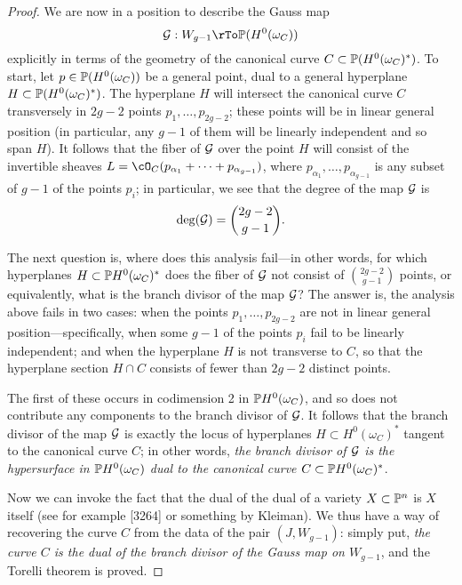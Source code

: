 \begin{proof}

We are now in a position to describe the Gauss map
$$
\cG : W_{g-1} \rTo  \PP(H^0(\omega_C))
$$
explicitly in terms of the geometry of the canonical curve $C \subset \PP(H^0(\omega_C)^*)$. To start, let $p \in \PP(H^0(\omega_C))$ be a general point, dual to a general hyperplane $H \subset \PP(H^0(\omega_C)^*)$. The hyperplane $H$ will intersect the canonical curve $C$ transversely in $2g-2$ points $p_1,\dots,p_{2g-2}$; these points will be in linear general position (in particular, any $g-1$ of them will be linearly independent and so span $H$). It follows that the fiber of $\cG$ over the point $H$ will consist of the invertible sheaves $L = \cO_C(p_{\alpha_1} + \dots + p_{\alpha_{g-1}})$, where $p_{\alpha_1}, \dots, p_{\alpha_{g-1}}$ is any subset of $g-1$ of the points $p_i$; in particular, we see that the degree of the map $\cG$ is
$$
\deg (\cG) = \binom{2g-2}{g-1}.
$$

The next question is, where does this analysis fail---in other words, for which hyperplanes $H \subset \PP H^0(\omega_C)^*$ does the fiber of $\cG$ not consist of $\binom{2g-2}{g-1}$ points, or equivalently,
what is the branch divisor of the map $\cG$? The answer is, the analysis above fails in two cases: when the points $p_1,\dots, p_{2g-2}$ are not in linear general position---specifically, when some $g-1$ of the points $p_i$ fail to be linearly independent; and when the hyperplane $H$ is not transverse to $C$, so that the hyperplane section $H \cap C$ consists of fewer than $2g-2$ distinct points.

The first of these occurs in codimension 2 in $\PP H^0(\omega_C)$, and so does not contribute any components to the branch divisor of $\cG$. It follows that the branch divisor of the map $\cG$ is exactly the locus of hyperplanes $H \subset H^0(\omega_C)^*$ tangent to the canonical curve $C$; in other words, \emph{the branch divisor of $\cG$ is the hypersurface in $\PP H^0(\omega_C)$ dual to the canonical curve $C \subset \PP H^0(\omega_C)^*$}.

Now we can  invoke the fact that the dual of the dual of a variety $X \subset \PP^n$ is $X$ itself (see for example [3264] or something by Kleiman). We thus have a way of recovering the curve $C$ from the data of the pair $(J, W_{g-1})$: simply put, \emph{the curve $C$ is the dual of the branch divisor of the Gauss map on $W_{g-1}$}, and the Torelli theorem is proved.

\end{proof}

